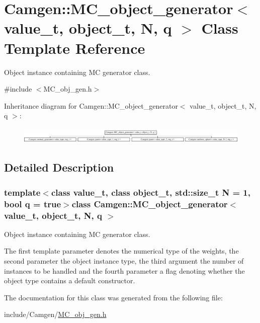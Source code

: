 \hypertarget{a00364}{\section{Camgen\-:\-:M\-C\-\_\-object\-\_\-generator$<$ value\-\_\-t, object\-\_\-t, N, q $>$ Class Template Reference}
\label{a00364}
}


Object instance containing M\-C generator class.  




{\ttfamily \#include $<$M\-C\-\_\-obj\-\_\-gen.\-h$>$}

Inheritance diagram for Camgen\-:\-:M\-C\-\_\-object\-\_\-generator$<$ value\-\_\-t, object\-\_\-t, N, q $>$\-:\begin{figure}[H]
\begin{center}
\leavevmode
\includegraphics[height=0.809249cm]{a00364}
\end{center}
\end{figure}


\subsection{Detailed Description}
\subsubsection*{template$<$class value\-\_\-t, class object\-\_\-t, std\-::size\-\_\-t N = 1, bool q = true$>$class Camgen\-::\-M\-C\-\_\-object\-\_\-generator$<$ value\-\_\-t, object\-\_\-t, N, q $>$}

Object instance containing M\-C generator class. 

The first template parameter denotes the numerical type of the weights, the second parameter the object instance type, the third argument the number of instances to be handled and the fourth parameter a flag denoting whether the object type contains a default constructor. 

The documentation for this class was generated from the following file\-:\begin{DoxyCompactItemize}
\item 
include/\-Camgen/\hyperlink{a00673}{M\-C\-\_\-obj\-\_\-gen.\-h}\end{DoxyCompactItemize}
